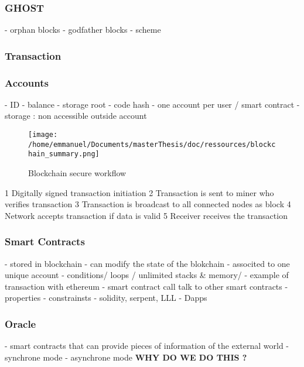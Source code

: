 \subsubsection{GHOST}
- orphan blocks
- godfather blocks
- scheme
\subsubsection{Transaction}
\subsubsection{Accounts}
 - ID
 \newline
 - balance
 \newline
 - storage root
 \newline
 - code hash
 \newline
 - one account per user / smart contract
 \newline
 - storage : non accessible outside account
 \newline
 \begin{figure}[htp]
\centering
\texttt{[image: /home/emmanuel/Documents/masterThesis/doc/ressources/blockchain\_summary.png]}
\caption{Blockchain secure workflow}
\label{}
\end{figure}
 1 	Digitally signed transaction initiation
2 	Transaction is sent to miner who verifies transaction
3 	Transaction is broadcast to all connected nodes as block
4 	Network accepts transaction if data is valid
5 	Receiver receives the transaction
  \subsubsection{Smart Contracts}
- stored in blockchain
\newline
- can modify the state of the blokchain
\newline
- associted to one unique account
\newline
- conditions/ loops / unlimited stacks \& memory/
\newline
- example of transaction with ethereum
\newline
- smart contract call talk to other smart contracts  
\newline
- properties 
- constrainsts
\newline
- solidity, serpent, LLL
\newline
- Dapps
\subsubsection{Oracle}
- smart contracts that can provide pieces of information of the external world
\newline
- synchrone mode
\newline
- asynchrone mode
\newline
\textbf{WHY DO WE DO THIS ?}

